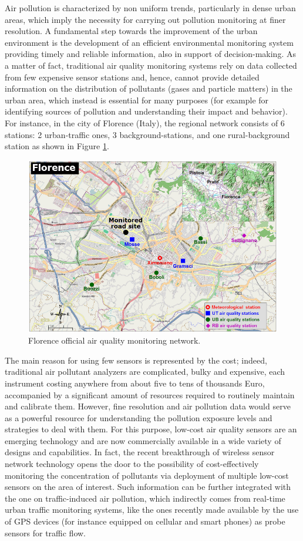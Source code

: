 \documentclass[journal]{IEEEtran}
\begin{document}
Air pollution is characterized by non uniform trends, particularly in dense
urban areas, which imply the necessity for carrying out pollution monitoring at finer resolution.
A fundamental step towards the
improvement of the urban environment is the development of an efficient environmental monitoring system
providing timely and reliable information, also in support of decision-making. 
As a matter of fact, traditional air quality monitoring systems rely on data collected from few
expensive sensor stations and, hence, cannot provide detailed information on the distribution of pollutants (gases and
particle matters) in the urban area, which instead is essential for many purposes (for example for identifying sources of
pollution and understanding their impact and behavior). For instance, in the city of Florence
(Italy), the regional network consists of 6 stations: 2 urban-traffic ones, 3
background-stations, and one rural-background station as shown in Figure \ref{fig:floNet}.
 \begin{figure}[!t]
	\centering
	\includegraphics[width=\columnwidth]{FixStation01.png}
	\caption{Florence official air quality monitoring network.}
	\label{fig:floNet}
\end{figure} 
The main reason for using few sensors is represented by the cost; indeed, traditional air pollutant analyzers are
complicated, bulky and expensive, each instrument costing anywhere from
about five to tens of thousands Euro, accompanied by a significant amount
of resources required to routinely maintain and calibrate them.
However, fine resolution and air pollution data would serve as a powerful resource for understanding the pollution exposure levels and strategies to deal with them.
For this purpose, low-cost air quality sensors are an emerging technology and are now commercially available in a wide variety of designs and capabilities. 
In fact, the recent breakthrough of wireless sensor network technology opens the door to the possibility of
cost-effectively monitoring the concentration of pollutants via deployment of multiple low-cost sensors on the area of
interest. Such information can be further integrated with the one on traffic-induced air pollution, which indirectly comes
from real-time urban traffic monitoring systems, like the ones recently made available by the use of GPS devices (for
instance equipped on cellular and smart phones) as probe sensors for traffic flow.
\end{document}

